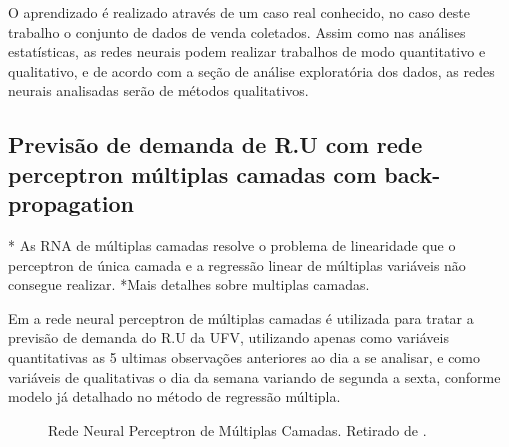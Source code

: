 \documentclass[	12pt, Times, openright, twoside, a4paper, english, brazil]{abntex2}
\begin{document}
O aprendizado é realizado através de um caso real conhecido, no caso deste trabalho o conjunto de dados de venda coletados.
Assim como nas análises estatísticas, as redes neurais podem realizar trabalhos de modo quantitativo e qualitativo, e de acordo com a seção de análise exploratória dos dados, as redes neurais analisadas serão de métodos qualitativos.


\subsection{Previsão de demanda de R.U com rede perceptron múltiplas camadas com back-propagation}
* As RNA de múltiplas camadas resolve o problema de linearidade que o perceptron de única camada e a regressão linear de múltiplas variáveis não consegue realizar. 
*Mais detalhes sobre multiplas camadas.

Em \cite{Lopes2008} a rede neural perceptron de múltiplas camadas é utilizada para tratar a previsão de demanda do R.U da UFV, utilizando apenas como variáveis quantitativas as 5 ultimas observações anteriores ao dia a se analisar, e como variáveis de qualitativas o dia da semana variando de segunda a sexta, conforme modelo já detalhado no método de regressão múltipla.
\begin{figure}[!ht]
	\caption{Rede Neural Perceptron de Múltiplas Camadas. Retirado de \cite{Lopes2008}.\label{fig:Rna-Perceptron-MultiLayer}}
\end{figure}
\end{document}
